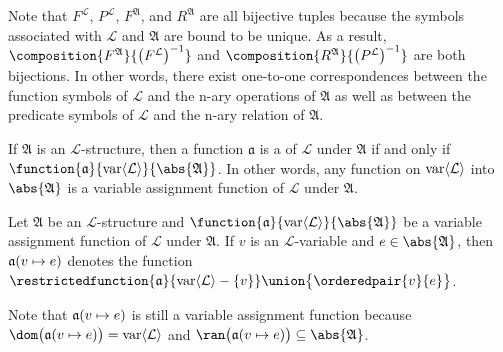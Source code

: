 \begin{rem}
     \label{one-to-one-correspondences-between-first-order-language-and-first-order-structure}
    Note that \( F^{\mathcal{L}} \), \( P^{\mathcal{L}} \), \( F^{\mathfrak{A}} \), and \( R^{\mathfrak{A}} \) are all bijective tuples
    because the symbols associated with \( \mathcal{L} \) and \( \mathfrak{A} \) are bound to be unique.
    As a result, \( \composition{F^{\mathfrak{A}}}{\mleft( F^{\mathcal{L}} \mright)^{-1}} \) and
    \( \composition{R^{\mathfrak{A}}}{\mleft( P^{\mathcal{L}} \mright)^{-1}} \) are both bijections.
    In other words, there exist one-to-one correspondences between the function symbols of \( \mathcal{L} \) and the n-ary operations of \( \mathfrak{A} \)
    as well as between the predicate symbols of \( \mathcal{L} \) and the n-ary relation of \( \mathfrak{A} \).
\end{rem}

\begin{dfn}
     \label{dfn:first-order-language-variable-assignment-function}
    If \( \mathfrak{A} \) is an \( \mathcal{L} \)-structure, then a function \( \mathfrak{a} \) is a 
    of \( \mathcal{L} \) under \( \mathfrak{A} \) if and only if \( \function{\mathfrak{a}}{\folvars{\mathcal{L}}}{\abs{\mathfrak{A}}} \).
    In other words, any function on \( \operatorname{var} \langle\mathcal{L}\rangle \) into \( \abs{\mathfrak{A}} \) is a variable assignment function of \( \mathcal{L} \) under \( \mathfrak{A} \).
\end{dfn}

\begin{dfn}
     \label{dfn:first-order-language-modified-variable-assignment-function}
    Let \( \mathfrak{A} \) be an \( \mathcal{L} \)-structure and \( \function{\mathfrak{a}}{\folvars{\mathcal{L}}}{\abs{\mathfrak{A}}} \) be a variable assignment function of
    \( \mathcal{L} \) under \( \mathfrak{A} \).
    If \( v \) is an \( \mathcal{L} \)-variable and \( e \in \abs{\mathfrak{A}} \), then \( \folmodifiedvariableassignmentfunction{\mathfrak{a}}{v}{e} \) denotes
    the function \( \restrictedfunction{\mathfrak{a}}{ \folvars{\mathcal{L}} - \mleft\{ v \mright\} } \union \big\{ \orderedpair{v}{e} \big\} \).
\end{dfn}

\begin{rem}
    Note that \( \folmodifiedvariableassignmentfunction{\mathfrak{a}}{v}{e} \) is still a variable assignment function because
    \( \dom \big( \folmodifiedvariableassignmentfunction{\mathfrak{a}}{v}{e} \big) = \folvars{\mathcal{L}} \)
    and \( \ran \big( \folmodifiedvariableassignmentfunction{\mathfrak{a}}{v}{e} \big) \subseteq \abs{\mathfrak{A}} \).
\end{rem}

